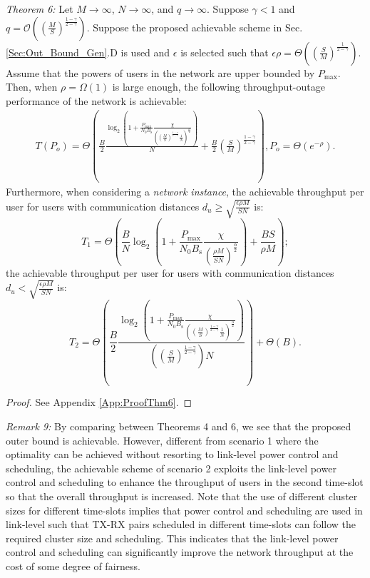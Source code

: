 \documentclass[journal,draftclsnofoot,onecolumn,12pt,twoside]{IEEEtran}
\begin{document}
{\em Theorem 6:} Let $M\to\infty$, $N\to\infty$, and $q\to\infty$. Suppose $\gamma<1$ and $q=\mathcal{O}\left(\left(\frac{M}{S}\right)^{\frac{1-\gamma}{2-\gamma}}\right)$. Suppose the proposed achievable scheme in Sec. \ref{Sec:Out_Bound_Gen}.D is used and $\epsilon$ is selected such that $\epsilon\rho=\Theta\left(\left(\frac{S}{M}\right)^{\frac{1}{2-\gamma}}\right)$. Assume that the powers of users in the network are upper bounded by $P_{\text{max}}$. Then, when $\rho=\Omega(1)$ is large enough, the following throughput-outage performance of the network is achievable:
\begin{equation}
\begin{aligned}
T(P_o)=\Theta\left(\frac{B}{2}\frac{\log_2\left(1+\frac{P_{\text{max}}}{N_0B_{\text{s}}}\frac{\chi}{\left(\left(\frac{M}{S}\right)^{\frac{1-\gamma}{2-\gamma}}\frac{1}{N}\right)^\frac{\alpha}{2}}\right)}{N}+\frac{B}{2}\left(\frac{S}{M}\right)^{\frac{1-\gamma}{2-\gamma}}\right),P_o= \Theta\left(e^{-\rho}\right).
\end{aligned}
\end{equation}
Furthermore, when considering a {\em network instance}, the achievable throughput per user for users with communication distances $d_u\geq \sqrt{\frac{\epsilon\rho M}{SN}}$ is:
\begin{equation}
T_1= \Theta\left(\frac{B}{N}\log_2\left(1+\frac{P_{\text{max}}}{N_0B_{\text{s}}}\frac{\chi}{\left(\frac{\rho M}{SN}\right)^\frac{\alpha}{2}}\right)+\frac{BS}{\rho M}\right);
\end{equation}
the achievable throughput per user for users with communication distances $d_u<\sqrt{\frac{\epsilon\rho M}{SN}}$ is:
\begin{equation}
T_2=\Theta\left(\frac{B}{2}\frac{\log_2\left(1+\frac{P_{\text{max}}}{N_0B_{\text{s}}}\frac{\chi}{\left(\left(\frac{M}{S}\right)^{\frac{1-\gamma}{2-\gamma}}\frac{1}{N}\right)^\frac{\alpha}{2}}\right)}{\left(\left(\frac{S}{M}\right)^{\frac{1-\gamma}{2-\gamma}}\right)N}\right)+\Theta(B).
\end{equation}
\begin{proof}
See Appendix \ref{App:ProofThm6}.
\end{proof}

{\em Remark 9:} By comparing between Theorems 4 and 6, we see that the proposed outer bound is achievable. However, different from scenario 1 where the optimality can be achieved without resorting to link-level power control and scheduling, the achievable scheme of scenario 2 exploits the link-level power control and scheduling to enhance the throughput of users in the second time-slot so that the overall throughput is increased. Note that the use of different cluster sizes for different time-slots implies that power control and scheduling are used in link-level such that TX-RX pairs scheduled in different time-slots can follow the required cluster size and scheduling. This indicates that the link-level power control and scheduling can significantly improve the network throughput at the cost of some degree of fairness.
\end{document}

